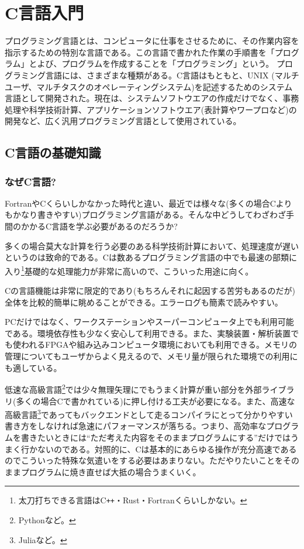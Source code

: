 \chapter{C言語入門}

\noindent
プログラミング言語とは、コンピュータに仕事をさせるために、その作業内容を指示するための特別な言語である。この言語で書かれた作業の手順書を「プログラム」とよび、プログラムを作成することを「プログラミング」という。
プログラミング言語には、さまざまな種類がある。C言語はもともと、UNIX (マルチユーザ、マルチタスクのオペレーティングシステム)を記述するためのシステム言語として開発された。現在は、システムソフトウエアの作成だけでなく、事務処理や科学技術計算、アプリケーションソフトウエア(表計算やワープロなど)の開発など、広く汎用プログラミング言語として使用されている。

\section{C言語の基礎知識}
\label{sec:C:basic}
\subsection{なぜC言語?}

FortranやCくらいしかなかった時代と違い、最近では様々な(多くの場合Cよりもかなり書きやすい)プログラミング言語がある。そんな中どうしてわざわざ手間のかかるC言語を学ぶ必要があるのだろうか?

多くの場合莫大な計算を行う必要のある科学技術計算において、処理速度が遅いというのは致命的である。Cは数あるプログラミング言語の中でも最速の部類に入り\footnote{太刀打ちできる言語はC\texttt{++}・Rust・Fortranくらいしかない。}基礎的な処理能力が非常に高いので、こういった用途に向く。

Cの言語機能は非常に限定的であり(もちろんそれに起因する苦労もあるのだが)全体を比較的簡単に眺めることができる。エラーログも簡素で読みやすい。

PCだけではなく、ワークステーションやスーパーコンピュータ上でも利用可能である。環境依存性も少なく安心して利用できる。また、実験装置・解析装置でも使われるFPGAや組み込みコンピュータ環境においても利用できる。メモリの管理についてもユーザからよく見えるので、メモリ量が限られた環境での利用にも適している。

低速な高級言語\footnote{Pythonなど。}では少々無理矢理にでもうまく計算が重い部分を外部ライブラリ(多くの場合Cで書かれている)に押し付ける工夫が必要になる。また、高速な高級言語\footnote{Juliaなど。}であってもバックエンドとして走るコンパイラにとって分かりやすい書き方をしなければ急速にパフォーマンスが落ちる。つまり、高効率なプログラムを書きたいときには``ただ考えた内容をそのままプログラムにする''だけではうまく行かないのである。対照的に、Cは基本的にあらゆる操作が充分高速であるのでこういった特殊な気遣いをする必要はあまりない。ただやりたいことをそのままプログラムに焼き直せば大抵の場合うまくいく。

